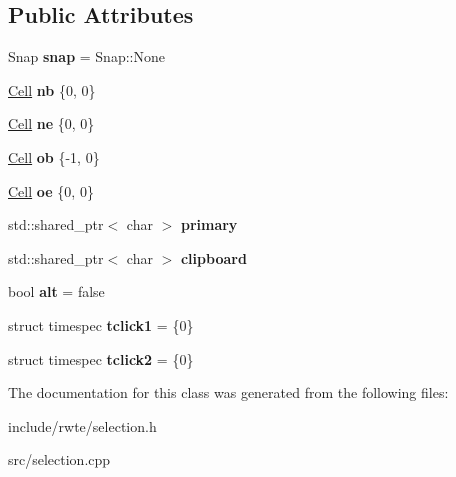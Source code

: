 \subsection*{Public Attributes}
\begin{DoxyCompactItemize}
\item 
\mbox{\label{classSelection_a4a2f566b70d119f421c40c1eece24a83}} 
Snap {\bfseries snap} = Snap\+::\+None
\item 
\mbox{\label{classSelection_adeea3a3e95a80b867b952da148f088df}} 
\mbox{\hyperlink{structCell}{Cell}} {\bfseries nb} \{0, 0\}
\item 
\mbox{\label{classSelection_ac28fb3205619435b23aeea0d720e6b7a}} 
\mbox{\hyperlink{structCell}{Cell}} {\bfseries ne} \{0, 0\}
\item 
\mbox{\label{classSelection_a3d1205362c500261eba1e35560753503}} 
\mbox{\hyperlink{structCell}{Cell}} {\bfseries ob} \{-\/1, 0\}
\item 
\mbox{\label{classSelection_acaeada0698bb434de049057cfe5b3576}} 
\mbox{\hyperlink{structCell}{Cell}} {\bfseries oe} \{0, 0\}
\item 
\mbox{\label{classSelection_a3d0d62d052665270276618c4e5df2e83}} 
std\+::shared\+\_\+ptr$<$ char $>$ {\bfseries primary}
\item 
\mbox{\label{classSelection_a4431f241c4ea42ff387687f1e4f42cd0}} 
std\+::shared\+\_\+ptr$<$ char $>$ {\bfseries clipboard}
\item 
\mbox{\label{classSelection_a789d1c0295d93d4cfb6f80e854297a5f}} 
bool {\bfseries alt} = false
\item 
\mbox{\label{classSelection_a64da740e2e837f7edd8569d9018f2847}} 
struct timespec {\bfseries tclick1} = \{0\}
\item 
\mbox{\label{classSelection_aef9a39b31e636c7d91ef7c791dab7d71}} 
struct timespec {\bfseries tclick2} = \{0\}
\end{DoxyCompactItemize}


The documentation for this class was generated from the following files\+:\begin{DoxyCompactItemize}
\item 
include/rwte/selection.\+h\item 
src/selection.\+cpp\end{DoxyCompactItemize}
